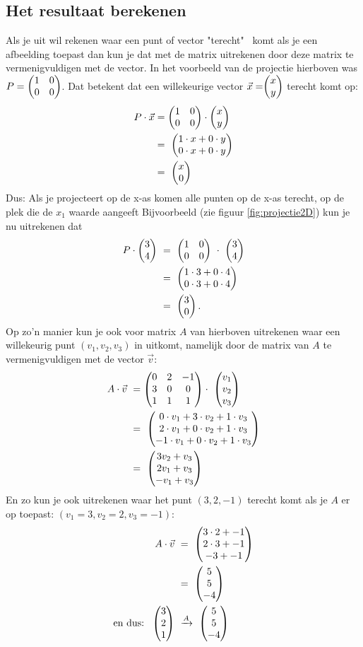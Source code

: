 \subsection{Het resultaat berekenen}
Als je uit wil rekenen waar een punt of vector "terecht" \ komt als je een afbeelding toepast dan kun je dat met de matrix uitrekenen door deze matrix te vermenigvuldigen met de vector. In het voorbeeld van de projectie hierboven was $ P = \begin{pmatrix} 1&0 \\ 0&0 \end{pmatrix} $. Dat betekent dat een willekeurige vector $ \vec{x} =  \vectwee{x}{y} $  terecht komt op: 
\begin{align*}
    P\cdot \vec{x} &= \begin{pmatrix} 1&0 \\ 0&0 \end{pmatrix}   \cdot \begin{pmatrix} x \\ y \end{pmatrix} \\
    &= \ \begin{pmatrix} 1\cdot x + 0\cdot y \\ 0\cdot x + 0\cdot y \end{pmatrix}  \\
    & = \ \begin{pmatrix} x \\ 0 \end{pmatrix}  
\end{align*}
Dus: Als je projecteert op de x-as komen alle punten  op de x-as terecht, op de plek die de $ x_1 $ waarde aangeeft Bijvoorbeeld (zie figuur \ref{fig:projectie2D}) kun je nu uitrekenen dat
\begin{align*}
    P \cdot \mattwee{3}{4}  \ &= \ \mattwee{1&0}{0&0}  \ \cdot \   \mattwee{3}{4}  \\
    &=  \ \mattwee{1\cdot 3 + 0\cdot 4}{0\cdot 3 + 0\cdot 4} \\
    &= \ \mattwee{3}{0}.  
\end{align*}
Op zo'n manier kun je ook voor  matrix $A$ van hierboven uitrekenen waar een willekeurig punt $ (v_1, v_2, v_3)  $ in \RD uitkomt, namelijk door de matrix van $A$ te vermenigvuldigen met de vector $ \vec{v} $:
\begin{align*}
A\cdot \vec{v} \ 
&= \matdrie{0&2&-1}{3&0&0}{1&1&1}  
\cdot  \ \matdrie{v_1}{v_2}{v_3}   \\
&= \ \matdrie{0\cdot v_1 + 3\cdot v_2 + 1\cdot v_3}{2\cdot v_1 + 0\cdot v_2+ 1\cdot v_3}{-1\cdot v_1 + 0\cdot v_2 + 1\cdot v_3}  \\
&= \ \matdrie{3v_2 + v_3}{2v_1 +  v_3}{-v_1 +  v_3} 
\end{align*}
En zo kun je ook  uitrekenen waar het punt $(3,2,-1)$ terecht komt als je $A$ er op toepast: $ (v_1 = 3, v_2 = 2 ,  v_3=-1 ):  $ 
\begin{align*}
\quad \ A\cdot \vec{v} \ &= \ \begin{pmatrix} 3\cdot 2 + -1 \\ 2\cdot 3+  -1 \\ -3 +  -1 \end{pmatrix} \\
    &= \  \begin{pmatrix} 5 \\ 5 \\ -4 \end{pmatrix} \\
    \text{en dus:} \ \ \begin{pmatrix} 3 \\ 2 \\ 1 \end{pmatrix}  \ & \xrightarrow{A}  \   \begin{pmatrix} 5 \\ 5 \\ -4 \end{pmatrix}
\end{align*}
